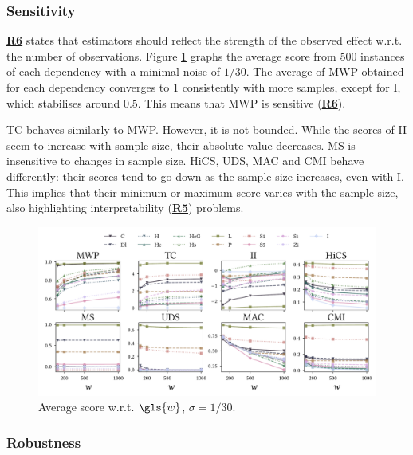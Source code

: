 \subsubsection{Sensitivity}
\label{sensitivity}

\hyperlink{R6}{\textbf{R6}} states that estimators should reflect the strength of the observed effect w.r.t. the number of observations. Figure \ref{fig:All_sensitivity} graphs the average score from 500 instances of each dependency with a minimal noise of $1/30$. The average of \gls{MWP} obtained for each dependency converges to 1 consistently with more samples, except for I, which stabilises around $0.5$. This means that \gls{MWP} is sensitive (\hyperlink{R6}{\textbf{R6}}). 

\gls{TC} behaves similarly to \gls{MWP}. %
However, it is not bounded. While the scores of \gls{II} seem to increase with sample size, their absolute value decreases. %
\gls{MS} is %
insensitive to changes in sample size. \gls{HiCS}, \gls{UDS}, \gls{MAC} and \gls{CMI} behave differently: their scores tend to go down as the sample size increases, even with I. This implies that their minimum or maximum score varies with the sample size, also highlighting interpretability (\hyperlink{R5}{\textbf{R5}})  problems. 

\begin{figure}
	\centering
	\includegraphics[width=\linewidth]{part2-figures/Fig8-2_thesis-compressed.pdf} 
	\caption{Average score w.r.t. $\gls{w}$, $\sigma = 1/30$.}
	\label{fig:All_sensitivity}
\end{figure} 

\subsubsection{Robustness}
\label{robustness}

